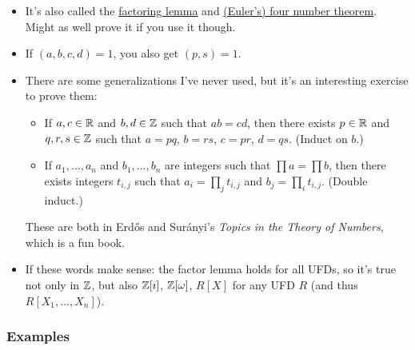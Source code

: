 \documentclass[11pt,paper=letter]{scrartcl}
\begin{document}
\begin{itemize}
\item It's also called the \href{https://services.artofproblemsolving.com/download.php?id=YXR0YWNobWVudHMvYS8wL2I3Njk1MjVjOTdjM2U5MWIxY2Q0NTkyZDQ3ZTVhNGVkMmYzOGMyLnBkZg==&rn=ZmFjdG9yLnBkZg==}{factoring lemma} and \href{https://math.stackexchange.com/questions/3771853/four-number-theorem-any-two-factorizations-ab-cd-have-a-common-refineme}{(Euler's) four number theorem}. Might as well prove it if you use it though.

\item If $(a, b, c, d) = 1$, you also get $(p, s) = 1$.

\item There are some generalizations I've never used, but it's an interesting exercise to prove them:
  \begin{itemize}
    \item If $a, c \in \mathbb R$ and $b, d \in \mathbb Z$ such that $ab = cd$, then there exists $p \in \mathbb R$ and $q, r, s \in \mathbb Z$ such that $a = pq$, $b = rs$, $c = pr$, $d = qs$. (Induct on $b$.)
    \item If $a_1, \ldots, a_n$ and $b_1, \ldots, b_n$ are integers such that $\prod a = \prod b$, then there exists integers $t_{i, j}$ such that $a_i = \prod_{j} t_{i, j}$ and $b_j = \prod_{i} t_{i, j}$. (Double induct.)
  \end{itemize}
These are both in Erd\H{o}s and Sur\'{a}nyi's \textit{Topics in the Theory of Numbers}, which is a fun book.


\item If these words make sense: the factor lemma holds for all UFDs, so it's true not only in $\mathbb Z$, but also $\mathbb Z[i]$, $\mathbb Z[\omega]$, $R[X]$ for any UFD $R$ (and thus $R[X_1, \ldots, X_n]$).
\end{itemize}

\subsubsection*{Examples}
\end{document}
